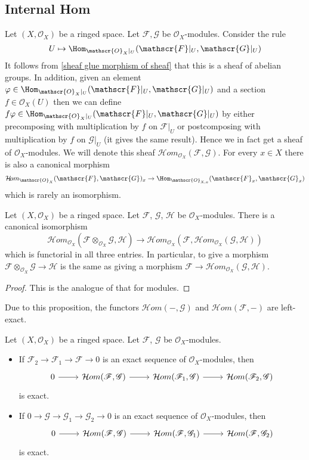 \subsection{Internal Hom}
Let $(X,\mathscr{O}_X)$ be a ringed space. Let $\mathscr{F},\mathscr{G}$ be $\mathscr{O}_X$-modules. Consider the rule
\[U\mapsto\Hom_{\mathscr{O}_X|_U}(\mathscr{F}|_U,\mathscr{G}|_U)\]
It follows from \cref{sheaf glue morphism of sheaf} that this is a sheaf of abelian groups. In addition, given an element $\varphi\in\Hom_{\mathscr{O}_X|_U}(\mathscr{F}|_U,\mathscr{G}|_U)$ and a section $f\in\mathscr{O}_X(U)$ then we can define $f\varphi\in\Hom_{\mathscr{O}_X|_U}(\mathscr{F}|_U,\mathscr{G}|_U)$ by either precomposing with multiplication by $f$ on $\mathscr{F}|_U$ or postcomposing with multiplication by $f$ on $\mathscr{G}|_U$ (it gives the same result). Hence we in fact get a sheaf of $\mathscr{O}_X$-modules. We will denote this sheaf $\mathcal{H}om_{\mathscr{O}_X}(\mathscr{F},\mathscr{G})$. For every $x\in X$ there is also a canonical morphism
\[\mathcal{H}\!om_{\mathscr{O}_X}(\mathscr{F},\mathscr{G})_x\to \Hom_{\mathscr{O}_{X,x}}(\mathscr{F}_x,\mathscr{G}_x)\]
which is rarely an isomorphism.
\begin{proposition}
Let $(X,\mathscr{O}_X)$ be a ringed space. Let $\mathscr{F}$, $\mathscr{G}$, $\mathscr{H}$ be $\mathscr{O}_X$-modules. There is a canonical isomorphism
\[\mathcal{H}om_{\mathscr{O}_X}(\mathscr{F}\otimes_{\mathscr{O}_X}\mathscr{G},\mathscr{H})\to \mathcal{H}om_{\mathscr{O}_X}(\mathscr{F},\mathcal{H}om_{\mathscr{O}_X}(\mathscr{G},\mathscr{H}))\]
which is functorial in all three entries. In particular, to give a morphism $\mathscr{F}\otimes_{\mathscr{O}_X}\mathscr{G}\to\mathscr{H}$ is the same as giving a morphism $\mathscr{F}\to\mathcal{H}om_{\mathscr{O}_X}(\mathscr{G},\mathscr{H})$.
\end{proposition}
\begin{proof}
This is the analogue of that for modules.
\end{proof}
Due to this proposition, the functors $\mathcal{H}om(-,\mathscr{G})$ and $\mathcal{H}om(\mathscr{F},-)$ are left-exact.
\begin{proposition}
Let $(X,\mathscr{O}_X)$ be a ringed space. Let $\mathscr{F}$, $\mathscr{G}$ be $\mathscr{O}_X$-modules.
\begin{itemize}
\item If $\mathscr{F}_2\to\mathscr{F}_1\to\mathscr{F}\to 0$ is an exact sequence of $\mathscr{O}_X$-modules, then
\[\begin{tikzcd}
0\ar[r]&\mathcal{H}om(\mathscr{F},\mathscr{G})\ar[r]&\mathcal{H}om(\mathscr{F}_1,\mathscr{G})\ar[r]&\mathcal{H}om(\mathscr{F}_2,\mathscr{G})
\end{tikzcd}\]
is exact.
\item If $0\to\mathscr{G}\to\mathscr{G}_1\to\mathscr{G}_2\to 0$ is an exact sequence of $\mathscr{O}_X$-modules, then
\[\begin{tikzcd}
0\ar[r]&\mathcal{H}om(\mathscr{F},\mathscr{G})\ar[r]&\mathcal{H}om(\mathscr{F},\mathscr{G}_1)\ar[r]&\mathcal{H}om(\mathscr{F},\mathscr{G}_2)
\end{tikzcd}\]
is exact.
\end{itemize}
\end{proposition}
